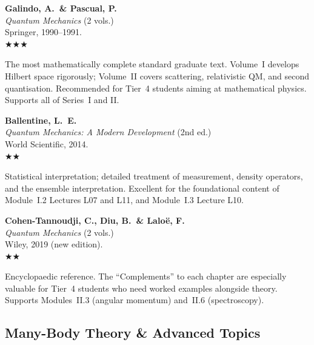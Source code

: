 \documentclass[11pt,a4paper]{article}
\newcommand{\essential}{$\bigstar\bigstar\bigstar$}
\newcommand{\recommended}{$\bigstar\bigstar$}
\newenvironment{bibentry}[1]{%
  \begin{tcolorbox}[entrybox=#1, top=4pt, bottom=4pt]%
}{%
  \end{tcolorbox}\smallskip%
}
\begin{document}
\begin{bibentry}{t4light}
\textbf{Galindo, A.\ \& Pascual, P.}\\
\textit{Quantum Mechanics} (2 vols.)\\
Springer, 1990--1991.\\[4pt]
\essential\\[4pt]
\begin{tcolorbox}[annotbox]
The most mathematically complete standard graduate text. Volume~I develops Hilbert
space rigorously; Volume~II covers scattering, relativistic QM, and second
quantisation. Recommended for Tier~4 students aiming at mathematical physics.
Supports all of Series~I and II.
\end{tcolorbox}
\end{bibentry}

\begin{bibentry}{t4light}
\textbf{Ballentine, L.~E.}\\
\textit{Quantum Mechanics: A Modern Development} (2nd ed.)\\
World Scientific, 2014.\\[4pt]
\recommended\\[4pt]
\begin{tcolorbox}[annotbox]
Statistical interpretation; detailed treatment of measurement, density operators,
and the ensemble interpretation. Excellent for the foundational content of Module~I.2
Lectures L07 and L11, and Module~I.3 Lecture L10.
\end{tcolorbox}
\end{bibentry}

\begin{bibentry}{t4light}
\textbf{Cohen-Tannoudji, C., Diu, B.\ \& Lalo\"e, F.}\\
\textit{Quantum Mechanics} (2 vols.)\\
Wiley, 2019 (new edition).\\[4pt]
\recommended\\[4pt]
\begin{tcolorbox}[annotbox]
Encyclopaedic reference. The ``Complements'' to each chapter are especially valuable
for Tier~4 students who need worked examples alongside theory. Supports
Modules~II.3 (angular momentum) and~II.6 (spectroscopy).
\end{tcolorbox}
\end{bibentry}

\subsection{Many-Body Theory \& Advanced Topics}
\end{document}
